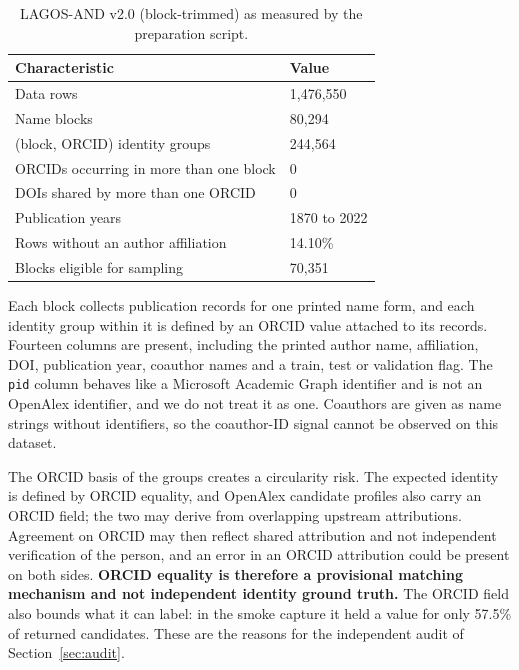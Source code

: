 \begin{table}[t]
\caption{LAGOS-AND v2.0 (block-trimmed) as measured by the preparation script.}
\label{tab:dataset}
\centering
\footnotesize
\renewcommand{\arraystretch}{1.1}
\begin{tabular}{@{}p{}p{}@{}}
\toprule
\textbf{Characteristic} & \textbf{Value} \\
\midrule
Data rows & 1,476,550 \\
Name blocks & 80,294 \\
(block, ORCID) identity groups & 244,564 \\
ORCIDs occurring in more than one block & 0 \\
DOIs shared by more than one ORCID & 0 \\
Publication years & 1870 to 2022 \\
Rows without an author affiliation & 14.10\% \\
Blocks eligible for sampling & 70,351 \\
\bottomrule
\end{tabular}
\end{table}

Each block collects publication records for one printed name form, and each identity group within it is defined by an ORCID value attached to its records. Fourteen columns are present, including the printed author name, affiliation, DOI, publication year, coauthor names and a train, test or validation flag. The \texttt{pid} column behaves like a Microsoft Academic Graph identifier and is not an OpenAlex identifier, and we do not treat it as one. Coauthors are given as name strings without identifiers, so the coauthor-ID signal cannot be observed on this dataset.

The ORCID basis of the groups creates a circularity risk. The expected identity is defined by ORCID equality, and OpenAlex candidate profiles also carry an ORCID field; the two may derive from overlapping upstream attributions. Agreement on ORCID may then reflect shared attribution and not independent verification of the person, and an error in an ORCID attribution could be present on both sides. \textbf{ORCID equality is therefore a provisional matching mechanism and not independent identity ground truth.} The ORCID field also bounds what it can label: in the smoke capture it held a value for only 57.5\% of returned candidates. These are the reasons for the independent audit of Section~\ref{sec:audit}.

